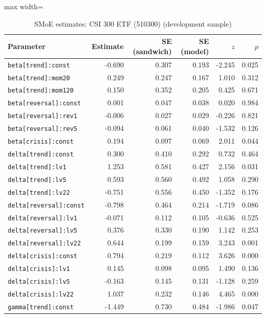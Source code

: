 \begin{table}[!htbp]\centering\scriptsize
\caption{SMoE estimates: CSI 300 ETF (510300) (development sample)}\label{tab:params_etf510300}
\begin{adjustbox}{max width=\textwidth}
\begin{tabular}{lrrrrr}
\toprule
Parameter & Estimate & SE (sandwich) & SE (model) & $z$ & $p$\\
\midrule
\texttt{beta[trend]:const} & -0.690 & 0.307 & 0.193 & -2.245 & 0.025\\
\texttt{beta[trend]:mom20} & 0.249 & 0.247 & 0.167 & 1.010 & 0.312\\
\texttt{beta[trend]:mom120} & 0.150 & 0.352 & 0.205 & 0.425 & 0.671\\
\texttt{beta[reversal]:const} & 0.001 & 0.047 & 0.038 & 0.020 & 0.984\\
\texttt{beta[reversal]:rev1} & -0.006 & 0.027 & 0.029 & -0.226 & 0.821\\
\texttt{beta[reversal]:rev5} & -0.094 & 0.061 & 0.040 & -1.532 & 0.126\\
\texttt{beta[crisis]:const} & 0.194 & 0.097 & 0.069 & 2.011 & 0.044\\
\texttt{delta[trend]:const} & 0.300 & 0.410 & 0.292 & 0.732 & 0.464\\
\texttt{delta[trend]:lv1} & 1.253 & 0.581 & 0.427 & 2.156 & 0.031\\
\texttt{delta[trend]:lv5} & 0.593 & 0.560 & 0.492 & 1.058 & 0.290\\
\texttt{delta[trend]:lv22} & -0.751 & 0.556 & 0.450 & -1.352 & 0.176\\
\texttt{delta[reversal]:const} & -0.798 & 0.464 & 0.214 & -1.719 & 0.086\\
\texttt{delta[reversal]:lv1} & -0.071 & 0.112 & 0.105 & -0.636 & 0.525\\
\texttt{delta[reversal]:lv5} & 0.376 & 0.330 & 0.190 & 1.142 & 0.253\\
\texttt{delta[reversal]:lv22} & 0.644 & 0.199 & 0.159 & 3.243 & 0.001\\
\texttt{delta[crisis]:const} & 0.794 & 0.219 & 0.112 & 3.626 & 0.000\\
\texttt{delta[crisis]:lv1} & 0.145 & 0.098 & 0.095 & 1.490 & 0.136\\
\texttt{delta[crisis]:lv5} & -0.163 & 0.145 & 0.131 & -1.128 & 0.259\\
\texttt{delta[crisis]:lv22} & 1.037 & 0.232 & 0.146 & 4.465 & 0.000\\
\texttt{gamma[trend]:const} & -1.449 & 0.730 & 0.484 & -1.986 & 0.047\\

\end{tabular}
\end{adjustbox}
\end{table}
